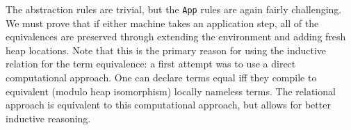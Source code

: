 The abstraction rules are trivial, but the \texttt{App} rules are again fairly
challenging. We must prove that if either machine takes an application step, all
of the equivalences are preserved through extending the environment and adding
fresh heap locations. Note that this is the primary reason for using the
inductive relation for the term equivalence: a first attempt was to use a direct
computational approach. One can declare terms equal iff they compile to
equivalent (modulo heap isomorphism) locally nameless terms. The relational
approach is equivalent to this computational approach, but allows for better
inductive reasoning. 

